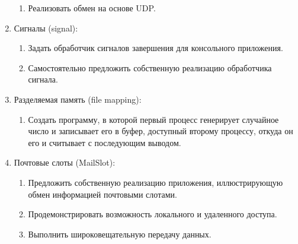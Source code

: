 \begin{enumerate}
\begin{enumerate}
			\item Реализовать обмен на основе UDP.
		\end{enumerate}
	\item Сигналы (signal):
		\begin{enumerate}
			\item Задать обработчик сигналов завершения для консольного приложения.
			\item Самостоятельно предложить собственную реализацию обработчика сигнала.
		\end{enumerate}
	\item Разделяемая память (file mapping):
		\begin{enumerate}
			\item Создать программу, в которой первый процесс генерирует случайное число и записывает его в буфер, доступный второму процессу, откуда он его и считывает с последующим выводом.
		\end{enumerate}
	\item Почтовые слоты (MailSlot):
		\begin{enumerate}
			\item Предложить собственную реализацию приложения, иллюстрирующую обмен информацией почтовыми слотами.
			\item Продемонстрировать возможность локального и удаленного доступа.
			\item Выполнить широковещательную передачу данных.
		\end{enumerate}
\end{enumerate}